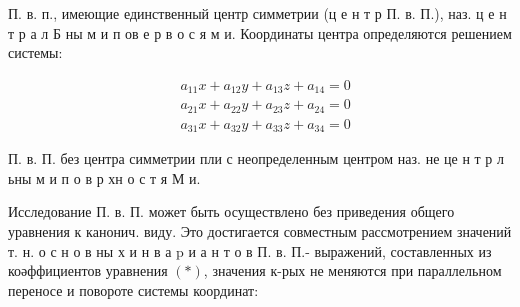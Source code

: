 \documentclass[10pt]{article}
\begin{document}
П. в. п., имеющие единственный центр симметрии (ц е н т р П. в. П.), наз. ц е н т р а л Б ны м и п ов е р в о с я м и. Координаты центра определяются решением системы:



\[

\begin{aligned}

& a_{11} x+a_{12} y+a_{13} z+a_{14}=0 \\

& a_{21} x+a_{22} y+a_{23} z+a_{24}=0 \\

& a_{31} x+a_{32} y+a_{33} z+a_{34}=0

\end{aligned}

\]



П. в. П. без центра симметрии пли с неопределенным центром наз. не це н т р л ьны м и п о в р хн о с т я М и.



Исследование П. в. П. может быть осуществлено без приведения общего уравнения к канонич. виду. Это достигается совместным рассмотрением значений т. н. о с н о в ны х и н в а p и а н т о в П. в. П.- выражений, составленных из коәффициентов уравнения $(*)$, значения к-рых не меняются при параллельном переносе и повороте системы координат:
\end{document}
